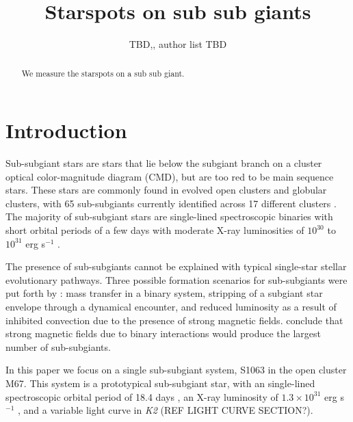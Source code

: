 \documentclass[twocolumn]{emulateapj}%
\begin{document}
\title{Starspots on sub sub giants }

\author{TBD,, author list TBD}



\begin{abstract}

We measure the starspots on a sub sub giant.

\end{abstract}


\maketitle

\section{Introduction}\label{sec:intro}

Sub-subgiant stars are stars that lie below the subgiant branch on a cluster optical color-magnitude diagram (CMD), but are too red to be main sequence stars. These stars are commonly found in evolved open clusters and globular clusters, with 65 sub-subgiants currently identified across 17 different clusters \citep{geller17}. The majority of sub-subgiant stars are single-lined spectroscopic binaries with short orbital periods of a few days with moderate X-ray luminosities of $10^{30}$ to $10^{31}$ erg s$^{-1}$ \citep[and references therein]{geller17}.

The presence of sub-subgiants cannot be explained with typical single-star stellar evolutionary pathways. Three possible formation scenarios for sub-subgiants were put forth by \citet{leiner17}: mass transfer in a binary system, stripping of a subgiant star envelope through a dynamical encounter, and reduced luminosity as a result of inhibited convection due to the presence of strong magnetic fields. \citet{leiner17} conclude that strong magnetic fields due to binary interactions would produce the largest number of sub-subgiants.

In this paper we focus on a single sub-subgiant system, S1063 in the open cluster M67. This system is a prototypical sub-subgiant star, with an single-lined spectroscopic orbital period of 18.4 days \citep{geller17}, an X-ray luminosity of $1.3\times10^{31}$ erg s$^{-1}$ \citep{vandenberg99}, and a variable light curve in \textit{K2} (REF LIGHT CURVE SECTION?).
\end{document}
